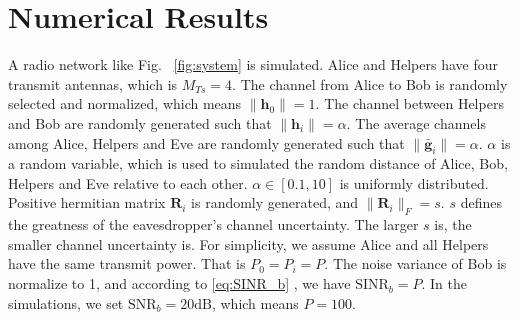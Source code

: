 \documentclass[conference]{IEEEtran}
\begin{document}
%

\section{Numerical Results} \label{sec:numerical results}
A radio network like Fig. ~\ref{fig:system} is simulated. Alice and Helpers have four transmit antennas, which is $M_{Ts}= 4$. The channel from Alice to Bob is randomly selected and normalized, which means $\|\mathbf{h}_0\| = 1$. The channel between Helpers and Bob are randomly generated such that $\|\mathbf{h}_i\| = \alpha$.  The average channels among Alice, Helpers  and Eve are randomly generated such that $\|\bar{\mathbf{g}}_i\| = \alpha$. $\alpha$ is a random variable, which is used to simulated the random distance of Alice, Bob, Helpers and Eve relative to each other. $\alpha \in  [0.1,10]$ is uniformly distributed.  Positive hermitian matrix $\mathbf{R}_i$ is randomly generated, and $\|\mathbf{R}_i\|_F = s$. $s$ defines the greatness of the eavesdropper's channel uncertainty. The larger $s$ is, the smaller channel uncertainty is. 
For simplicity, we assume Alice and all Helpers have the same transmit power. That is $P_0=P_i = P$. The noise variance of Bob is normalize to 1,  and according to \eqref{eq:SINR_b} , we have $\mathrm{SINR}_b = P$. In the simulations, we set $\mathrm{SNR}_b = 20 \mathrm{dB}$, which means $P = 100$.
\end{document}
